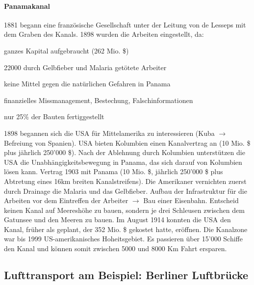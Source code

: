\documentclass[10pt, openright=true]{scrartcl}
\begin{document}
\paragraph{Panamakanal}
1881 begann eine französische Gesellschaft unter der Leitung von de Lesseps mit dem Graben des Kanals. 1898 wurden die Arbeiten eingestellt, da:
\begin{citemize}
\item ganzes Kapital aufgebraucht (262 Mio. \$)
\item 22000 durch Gelbfieber und Malaria getötete Arbeiter
\item keine Mittel gegen die natürlichen Gefahren in Panama
\item finanzielles Missmanagement, Bestechung, Falschinformationen
\item nur 25\% der Bauten fertiggestellt
\end{citemize}
1898 begannen sich die USA für Mittelamerika zu interessieren (Kuba $ \rightarrow $Befreiung von Spanien). USA bieten Kolumbien einen Kanalvertrag an (10 Mio. \$ plus jährlich 250’000 \$). Nach der Ablehnung durch Kolumbien unterstützen die USA die Unabhängigkeitsbewegung in Panama, das sich darauf von Kolumbien lösen kann. Vertrag 1903 mit Panama (10 Mio. \$, jährlich 250’000 \$ plus Abtretung eines 16km breiten Kanalstreifens). Die Amerikaner vernichten zuerst durch Drainage die Malaria und das Gelbfieber. Aufbau der Infrastruktur für die Arbeiten vor dem Eintreffen der Arbeiter $ \rightarrow $ Bau einer Eisenbahn. Entscheid keinen Kanal auf Meereshöhe zu bauen, sondern je drei Schleusen zwischen dem Gatunsee und den Meeren zu bauen. Im August 1914 konnten die USA den Kanal, früher als geplant, der 352 Mio. \$ gekostet hatte, eröffnen. Die Kanalzone war bis 1999 US-amerikanisches Hoheitsgebiet. Es passieren über 15’000 Schiffe den Kanal und können somit zwischen 5000 und 8000 Km Fahrt ersparen.
\subsection{Lufttransport am Beispiel: Berliner  Luftbrücke}
\end{document}
